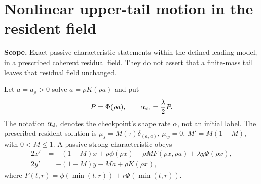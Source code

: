 \documentclass[11pt]{article}
\numberwithin{equation}{section}
\theoremstyle{remark}\newtheorem{remark}[theorem]{Remark}
\newcommand{\1}{\mathbf 1}
\newcommand{\scope}[1]{\par\noindent\textbf{Scope.} #1\par\smallskip}
\begin{document}
\section{Nonlinear upper-tail motion in the resident field}
\label{inc:AN02:tail:v1:resident}
\scope{Exact passive-characteristic statements within the defined leading
model, in a prescribed coherent residual field. They do not assert that a
finite-mass tail leaves that residual field unchanged.}
Let $a=a_\rho>0$ solve $a=\rho K(\rho a)$ and put
\[
 P=\Phi(\rho a),\qquad \alpha_{\rm sh}=\frac\lambda2P.
\]
The notation $\alpha_{\rm sh}$ denotes the checkpoint's shape rate $\alpha$,
not an initial label. The prescribed resident solution is
$\mu_s=M(\tau)\delta_{(a,a)}$, $\mu_w=0$, $M'=M(1-M)$,
with $0<M\le1$. A passive strong characteristic obeys
\begin{align}
 2x'&=-(1-M)x+\rho\phi(\rho x)-\rho M F(\rho x,\rho a)
 +\lambda y\Phi(\rho x),\label{inc:AN02:tail:v1:passive}\\
 2y'&=-(1-M)y-Ma+\rho K(\rho x),\nonumber
\end{align}
where $F(t,r)=\phi(\min(t,r))+r\Phi(\min(t,r))$.
\end{document}
